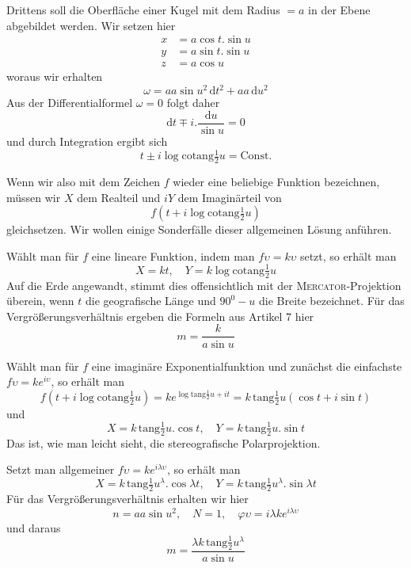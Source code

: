 Drittens soll die Oberfläche einer Kugel mit dem Radius \(=a\) in der Ebene abgebildet werden. Wir setzen hier
\[
\begin{aligned}
x&=a\cos t\mathord{.}\sin u\\
y&=a\sin t\mathord{.}\sin u\\
z&=a\cos u
\end{aligned}
\]
\noindent woraus wir erhalten
\[
\omega=aa\sin u^2\,\mathrm{d}t^2+aa\,\mathrm{d}u^2
\]
\noindent Aus der Differentialformel \(\omega=0\) folgt daher
\[
\mathrm{d}t\mp i\mathord{.}\frac{\mathrm{d}u}{\sin u}=0
\]
\noindent und durch Integration ergibt sich
\[
t\pm i\log\mathrm{cotang}\tfrac{1}{2}u=\text{Const.}
\]
\par\indent{}%
Wenn wir also mit dem Zeichen \(f\) wieder eine beliebige Funktion bezeichnen, müssen wir \(X\) dem Realteil und \(iY\) dem Imaginärteil von
\[
f(t+i\log\mathrm{cotang}\tfrac{1}{2}u)
\]
\noindent gleichsetzen. Wir wollen einige Sonderfälle dieser allgemeinen Lösung anführen.

Wählt man für \(f\) eine lineare Funktion, indem man \(f\upsilon=k\upsilon\) setzt, so erhält man
\[
X=kt,\quad Y=k\log\mathrm{cotang}\tfrac{1}{2}u
\]
\noindent Auf die Erde angewandt, stimmt dies offensichtlich mit der \textsc{Mercator}-Projektion überein, wenn \(t\) die geografische Länge und \(90^0-u\) die Breite bezeichnet. Für das Vergrößerungsverhältnis ergeben die Formeln aus Artikel 7 hier
\[
m=\frac{k}{a\sin u}
\]

Wählt man für \(f\) eine imaginäre Exponentialfunktion und zunächst die einfachste \(f\upsilon=ke^{i\upsilon}\), so erhält man
\[
f(t+i\log\mathrm{cotang}\tfrac{1}{2}u)=ke^{\log\mathrm{tang}\frac{1}{2}u+it}=k\,\mathrm{tang}\tfrac{1}{2}u(\cos t+i\sin t)
\]
\noindent und
\[
X=k\,\mathrm{tang}\tfrac{1}{2}u\mathord{.}\cos t,\quad
Y=k\,\mathrm{tang}\tfrac{1}{2}u\mathord{.}\sin t
\]
\noindent Das ist, wie man leicht sieht, die stereografische Polarprojektion.

Setzt man allgemeiner \(f\upsilon=ke^{i\lambda\upsilon}\), so erhält man
\[
X=k\,\mathrm{tang}\tfrac{1}{2}u^{\lambda}\mathord{.}\cos\lambda t,\quad
Y=k\,\mathrm{tang}\tfrac{1}{2}u^{\lambda}\mathord{.}\sin\lambda t
\]
\noindent Für das Vergrößerungsverhältnis erhalten wir hier
\[
n=aa\sin u^2,\quad N=1,\quad\varphi\upsilon=i\lambda ke^{i\lambda\upsilon}
\]
\noindent und daraus
\[
m=\frac{\lambda k\,\mathrm{tang}\frac{1}{2}u^{\lambda}}{a\sin u}
\]

